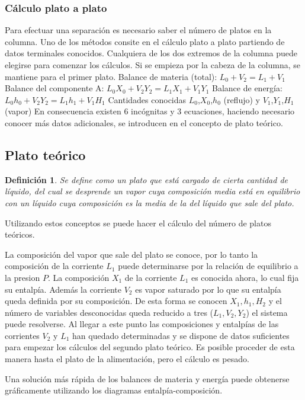 \documentclass[11pt,openany]{book}
\newtheorem{defi}{Definición}
\begin{document}
\subsubsection{Cálculo plato a plato}
Para efectuar una separación es necesario saber el número de platos en la columna.  
Uno de los métodos consite en el cálculo plato a plato partiendo de datos terminales conocidos.
Cualquiera de los dos extremos de la columna puede elegirse para comenzar los cálculos. Si se 
empieza por la cabeza de la columna, se mantiene para el primer plato.
\newline
Balance de materia (total): $L_0+V_2=L_1+V_1$
\newline \newline
Balance del componente A: $L_0 X_0 + V_2 Y_2 = L_1 X_1 + V_1 Y_1$
\newline \newline
Balance de energía: $L_0 h_0+V_2 Y_2=L_1 h_1+V_1 H_1$
\newline\newline
Cantidades conocidas $L_0$,$X_0$,$h_0$ (reflujo) y $V_1$,$Y_1$,$ H_1$ (vapor)
\newline\newline
En consecuencia existen 6 incógnitas y 3 ecuaciones, haciendo necesario conocer más datos 
adicionales, se introducen en el concepto de plato teórico.

\subsection{Plato teórico}
\begin{defi}
Se define como un plato que está cargado de cierta cantidad de líquido, del cual se desprende 
un vapor cuya composición media está en equilibrio con un líquido cuya composición es la media de 
la del líquido que sale del plato.
\end{defi}
Utilizando estos conceptos se puede hacer el cálculo del número de platos teóricos.

La composición del vapor que sale del plato se conoce, por lo tanto la composición de la corriente 
$L_1$ puede determinarse por la relación de equilibrio a la presion $P$. La composición $X_1$ de la corriente 
$L_1$ es conocida ahora, lo cual fija su entalpía. Además la corriente $V_2$ es vapor saturado por lo que 
su entalpía queda definida por su composición. De esta forma se conocen $X_1, h_1, H_2$ y el número 
de variables desconocidas queda reducido a tres ($L_1,V_2,Y_2$) el sistema puede resolverse. Al llegar a
este punto las composiciones y entalpías de las corrientes $V_2$ y $L_1$ han quedado determinadas y se 
dispone de datos suficientes para empezar los cálculos del segundo plato teórico. Es posible 
proceder de esta manera hasta el plato de la alimentación, pero el cálculo es pesado.

Una solución más rápida de los balances de materia y energía puede obtenerse gráficamente 
utilizando los diagramas entalpía-composición.
\end{document}
